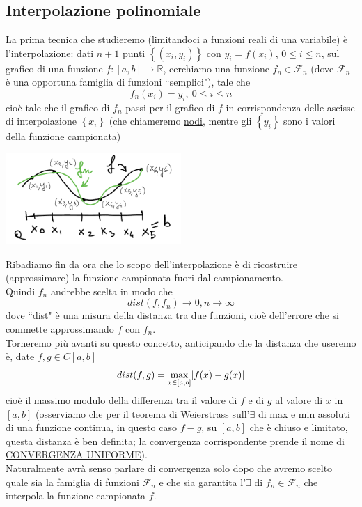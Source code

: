 \documentclass[12pt,headings=optiontohead]{article}
\DeclarePairedDelimiter{\abs}{\lvert}{\rvert}
\begin{document}
\subsection{Interpolazione polinomiale}
La prima tecnica che studieremo (limitandoci a funzioni reali di una variabile) è l'interpolazione: dati $n+1$ punti $\left\{ (x_i, y_i) \right\}$ con $y_i=f(x_i)$, $0 \leq i \leq n$, sul grafico di una funzione $f:[a,b] \rightarrow \mathbb{R}$, cerchiamo una funzione $f_n \in \mathcal{F}_n$ (dove $\mathcal{F}_n$ è una opportuna famiglia di funzioni ``semplici"), tale che
\[ f_n(x_i) = y_i, \ 0 \le i \le n \]
cioè tale che il grafico di $f_n$ passi per il grafico di $f$ in corrispondenza delle ascisse di interpolazione $\left\{ x_i \right\}$ (che chiameremo \uline{nodi}, mentre gli $\left\{ y_i \right\}$ sono i valori della funzione campionata)
\begin{center}
    \includegraphics[width=0.5\textwidth]{lez12_img1.png}
\end{center}
Ribadiamo fin da ora che lo scopo dell'interpolazione è di ricostruire (approssimare) la funzione campionata fuori dal campionamento.\\
Quindi $f_n$ andrebbe scelta in modo che 
\[ dist(f,f_n) \to 0, n \to \infty \]
dove ``dist" è una misura della distanza tra due funzioni, cioè dell'errore che si commette approssimando $f$ con $f_n$. \\
Torneremo più avanti su questo concetto, anticipando che la distanza che useremo è, date $f,g \in C[a,b]$
\[ dist(f,g) = \max_{x \in [a,b]} \abs{f(x) - g(x)} \]
cioè il massimo modulo della differenza tra il valore di $f$ e di $g$ al valore di $x$ in $[a,b]$ (osserviamo che per il teorema di Weierstrass sull'$\exists$ di max e min assoluti di una funzione continua, in questo caso $f-g$, su $[a, b]$ che è chiuso e limitato, questa distanza è ben definita; la convergenza corrispondente prende il nome di \uline{CONVERGENZA UNIFORME}).\\
Naturalmente avrà senso parlare di convergenza solo dopo che avremo scelto quale sia la famiglia di funzioni $\mathcal{F}_n$ e che sia garantita l'$\exists$ di $f_n \in \mathcal{F}_n$ che interpola la funzione campionata $f$. \\
\end{document}
